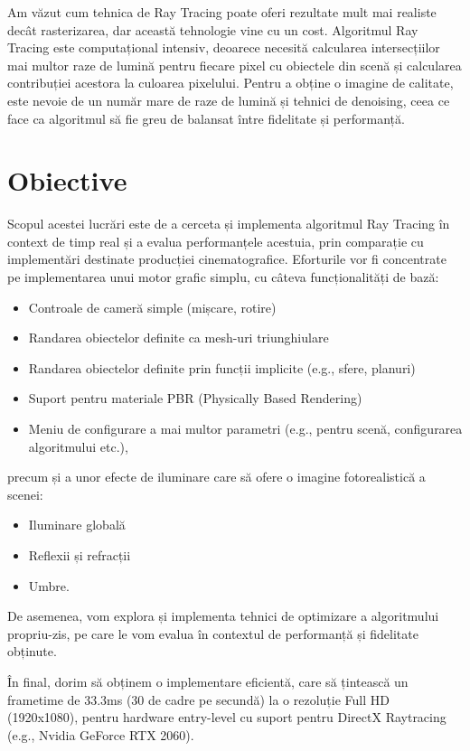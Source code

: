 \documentclass[12pt,a4paper]{report}
\numberwithin{equation}{section} %
\begin{document}
Am văzut cum tehnica de Ray Tracing poate oferi rezultate mult mai realiste
decât rasterizarea, dar această tehnologie vine cu un cost.
Algoritmul Ray Tracing este computațional intensiv, deoarece necesită
calcularea intersecțiilor mai multor raze de lumină pentru fiecare pixel cu obiectele din scenă
și calcularea contribuției acestora la culoarea pixelului. Pentru a obține o imagine
de calitate, este nevoie de un număr mare de raze de lumină și tehnici de denoising,
ceea ce face ca algoritmul să fie greu de balansat între fidelitate și performanță.

\section{Obiective}

Scopul acestei lucrări este de a cerceta și implementa algoritmul Ray Tracing în
context de timp real și a evalua performanțele acestuia, prin comparație cu
implementări destinate producției cinematografice. Eforturile vor fi concentrate
pe implementarea unui motor grafic simplu, cu câteva funcționalități de bază:
\begin{itemize}
	\item Controale de cameră simple (mișcare, rotire)
	\item Randarea obiectelor definite ca mesh-uri triunghiulare
	\item Randarea obiectelor definite prin funcții implicite (e.g., sfere, planuri)
	\item Suport pentru materiale PBR (Physically Based Rendering)
	\item Meniu de configurare a mai multor parametri (e.g., pentru scenă,
	      configurarea algoritmului etc.),
\end{itemize}
precum și a unor efecte de iluminare care să ofere o imagine fotorealistică a scenei:
\begin{itemize}
	\item Iluminare globală
	\item Reflexii și refracții
	\item Umbre.
\end{itemize}
De asemenea, vom explora și implementa tehnici de optimizare a algoritmului propriu-zis,
pe care le vom evalua în contextul de performanță și fidelitate obținute.

În final, dorim să obținem o implementare eficientă, care să țintească un frametime de 33.3ms
(30 de cadre pe secundă) la o rezoluție Full HD (1920x1080), pentru hardware entry-level cu suport pentru
DirectX Raytracing (e.g., Nvidia GeForce RTX 2060).
\end{document}
